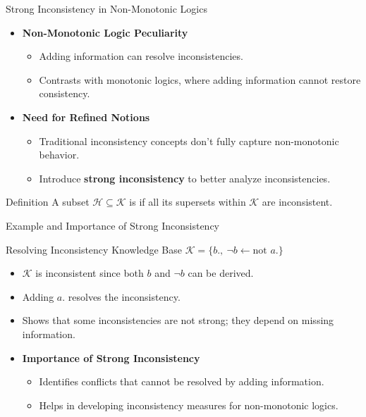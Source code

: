 \begin{frame}{Strong Inconsistency in Non-Monotonic Logics}
    \begin{itemize}
        \item \textbf{Non-Monotonic Logic Peculiarity}
              \begin{itemize}
                  \item Adding information can resolve inconsistencies.
                  \item Contrasts with monotonic logics, where adding information cannot restore consistency.
              \end{itemize}
        \item \textbf{Need for Refined Notions}
              \begin{itemize}
                  \item Traditional inconsistency concepts don't fully capture non-monotonic behavior.
                  \item Introduce \textbf{strong inconsistency} to better analyze inconsistencies.
              \end{itemize}
    \end{itemize}
    \begin{block}{Definition}
        A subset \( \mathcal{H} \subseteq \mathcal{K} \) is  if all its supersets within \( \mathcal{K} \) are inconsistent.
    \end{block}
\end{frame}

\begin{frame}{Example and Importance of Strong Inconsistency}
    \begin{exampleblock}{Resolving Inconsistency}
        Knowledge Base \( \mathcal{K} = \{ b.,\ \neg b \leftarrow \text{not } a. \} \)
        \begin{itemize}
            \item \( \mathcal{K} \) is inconsistent since both \( b \) and \( \neg b \) can be derived.
            \item Adding \( a. \) resolves the inconsistency.
            \item Shows that some inconsistencies are not strong; they depend on missing information.
        \end{itemize}
    \end{exampleblock}
    \begin{itemize}
        \item \textbf{Importance of Strong Inconsistency}
              \begin{itemize}
                  \item Identifies conflicts that cannot be resolved by adding information.
                  \item Helps in developing inconsistency measures for non-monotonic logics.
              \end{itemize}
    \end{itemize}
\end{frame}

